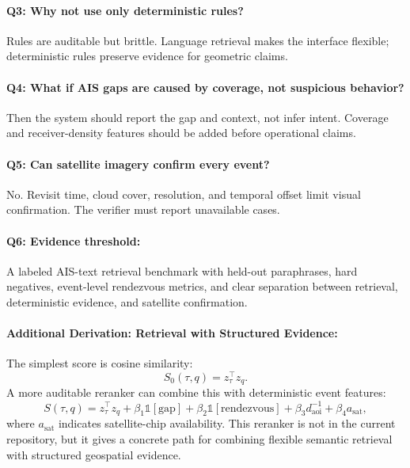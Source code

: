\documentclass{article}
\begin{document}
\paragraph{Q3: Why not use only deterministic rules?}
Rules are auditable but brittle. Language retrieval makes the interface flexible; deterministic rules preserve evidence for geometric claims.

\paragraph{Q4: What if AIS gaps are caused by coverage, not suspicious behavior?}
Then the system should report the gap and context, not infer intent. Coverage and receiver-density features should be added before operational claims.

\paragraph{Q5: Can satellite imagery confirm every event?}
No. Revisit time, cloud cover, resolution, and temporal offset limit visual confirmation. The verifier must report unavailable cases.

\paragraph{Q6: Evidence threshold:}
A labeled AIS-text retrieval benchmark with held-out paraphrases, hard negatives, event-level rendezvous metrics, and clear separation between retrieval, deterministic evidence, and satellite confirmation.

\paragraph{Additional Derivation: Retrieval with Structured Evidence:}

The simplest score is cosine similarity:
\begin{equation}
  S_0(\tau,q)=z_{\tau}^{\top}z_q.
\end{equation}
A more auditable reranker can combine this with deterministic event features:
\begin{equation}
  S(\tau,q)=z_{\tau}^{\top}z_q+\beta_1\mathbb{1}[\text{gap}]+\beta_2\mathbb{1}[\text{rendezvous}]
  +\beta_3 d_{\text{aoi}}^{-1}+\beta_4 a_{\text{sat}},
\end{equation}
where $a_{\text{sat}}$ indicates satellite-chip availability. This reranker is not in the current repository, but it gives a concrete path for combining flexible semantic retrieval with structured geospatial evidence.
\end{document}
